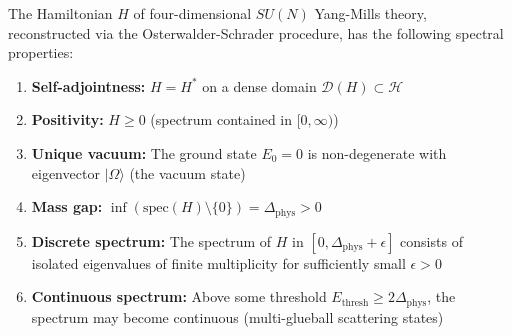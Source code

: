\begin{theorem}
\label{thm:hamiltonian-spectrum}
The Hamiltonian $H$ of four-dimensional $SU(N)$ Yang-Mills theory, reconstructed 
via the Osterwalder-Schrader procedure, has the following spectral properties:
\begin{enumerate}[label=(\roman*)]
\item \textbf{Self-adjointness:} $H = H^*$ on a dense domain $\mathcal{D}(H) \subset \mathcal{H}$
\item \textbf{Positivity:} $H \geq 0$ (spectrum contained in $[0, \infty)$)
\item \textbf{Unique vacuum:} The ground state $E_0 = 0$ is non-degenerate with 
eigenvector $|\Omega\rangle$ (the vacuum state)
\item \textbf{Mass gap:} $\inf(\text{spec}(H) \setminus \{0\}) = \Delta_{\text{phys}} > 0$
\item \textbf{Discrete spectrum:} The spectrum of $H$ in $[0, \Delta_{\text{phys}} + \epsilon]$ 
consists of isolated eigenvalues of finite multiplicity for sufficiently small $\epsilon > 0$
\item \textbf{Continuous spectrum:} Above some threshold $E_{\text{thresh}} \geq 2\Delta_{\text{phys}}$, 
the spectrum may become continuous (multi-glueball scattering states)
\end{enumerate}
\end{theorem}

